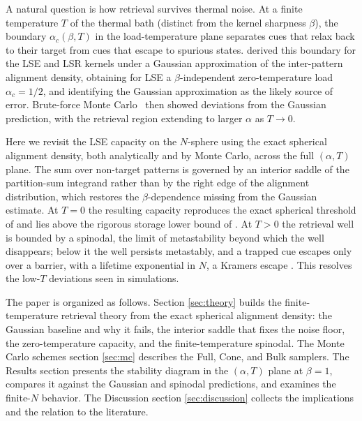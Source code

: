\documentclass[letterpaper]{article} %
\newcommand{\Bnet}{\beta}
\begin{document}
A natural question is how retrieval survives thermal noise. At a finite
temperature $T$ of the thermal bath (distinct from the kernel sharpness $\Bnet$), the boundary
$\alpha_c(\Bnet, T)$ in the load-temperature plane separates cues that relax back
to their target from cues that escape to spurious states.
\citet{icml2026theory} derived this boundary for the LSE and LSR kernels under a
Gaussian approximation of the inter-pattern alignment density, obtaining for LSE
a $\Bnet$-independent zero-temperature load $\alpha_c = 1/2$, and identifying the 
Gaussian approximation as the likely source of error. Brute-force Monte
Carlo~\citep{iclr2026mc} then showed deviations from the Gaussian
prediction, with the retrieval region extending to larger $\alpha$ as $T\to0$.

Here we revisit the LSE capacity on the $N$-sphere using the exact spherical
alignment density, both analytically and by Monte Carlo, across the full
$(\alpha, T)$ plane. The sum over non-target patterns is governed by an interior
saddle of the partition-sum integrand rather than by the right edge of the
alignment distribution, which restores the $\Bnet$-dependence missing from the
Gaussian estimate. At $T = 0$ the resulting capacity reproduces the exact
spherical threshold of \citet{lucibello2024exponential} and lies above the
rigorous storage lower bound of \citet{ramsauer2021hopfield}. At $T > 0$ the
retrieval well is bounded by a spinodal, the limit of metastability beyond which
the well disappears; below it the well persists metastably, and a trapped cue
escapes only over a barrier, with a lifetime exponential in $N$, a Kramers escape
\citep{kramers1940, hanggi1990}. This resolves the low-$T$ deviations seen in
simulations.

The paper is organized as follows. Section \ref{sec:theory} builds the
finite-temperature retrieval theory from the exact spherical alignment density:
the Gaussian baseline and why it fails, the interior saddle that fixes the noise
floor, the zero-temperature capacity, and the finite-temperature spinodal. The
Monte Carlo schemes section \ref{sec:mc} describes the Full, Cone, and Bulk samplers. The
Results section presents the stability diagram in the $(\alpha, T)$ plane at
$\Bnet = 1$, compares it against the Gaussian and spinodal predictions, and
examines the finite-$N$ behavior. The Discussion section \ref{sec:discussion} collects the
implications and the relation to the literature.


\end{document}
